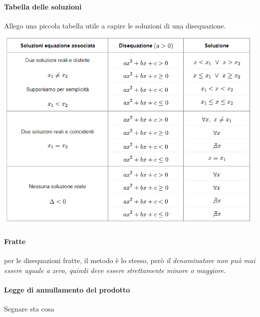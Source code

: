 \documentclass[12pt, a4paper, openany]{book}
\begin{document}
\paragraph*{Tabella delle soluzioni} Allego una piccola tabella utile a capire le soluzioni di una disequazione.
\includegraphics[width=\textwidth]{disequazioni.png}

\paragraph*{Fratte} per le disequazioni fratte, il metodo è lo stesso, però \emph{il denominatore non può mai essere uguale a zero, quindi deve essere strettamente minore o maggiore.}

\paragraph*{Legge di annullamento del prodotto}
Segnare sta cosa
\end{document}
